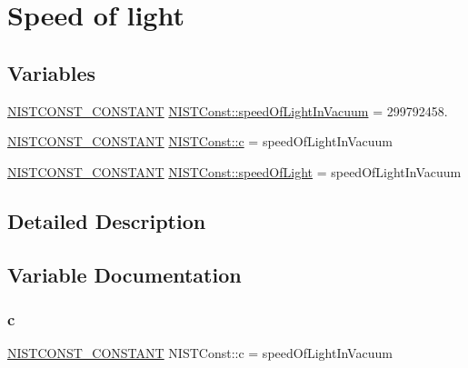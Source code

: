 \hypertarget{group___n_i_s_t_const-_speed_of_light}{}\section{Speed of light}
\label{group___n_i_s_t_const-_speed_of_light}
\subsection*{Variables}
\begin{DoxyCompactItemize}
\item 
\mbox{\hyperlink{group___n_i_s_t_const-_macros_ga2b0fc1d7452373f816175dd86ce26729}{N\+I\+S\+T\+C\+O\+N\+S\+T\+\_\+\+C\+O\+N\+S\+T\+A\+NT}} \mbox{\hyperlink{group___n_i_s_t_const-_speed_of_light_ga5b7c240e787216aab4b730470074888e}{N\+I\+S\+T\+Const\+::speed\+Of\+Light\+In\+Vacuum}} = 299792458.
\item 
\mbox{\hyperlink{group___n_i_s_t_const-_macros_ga2b0fc1d7452373f816175dd86ce26729}{N\+I\+S\+T\+C\+O\+N\+S\+T\+\_\+\+C\+O\+N\+S\+T\+A\+NT}} \mbox{\hyperlink{group___n_i_s_t_const-_speed_of_light_gadcdcae4ce541e73c0a15e25bf7f58fcf}{N\+I\+S\+T\+Const\+::c}} = speed\+Of\+Light\+In\+Vacuum
\item 
\mbox{\hyperlink{group___n_i_s_t_const-_macros_ga2b0fc1d7452373f816175dd86ce26729}{N\+I\+S\+T\+C\+O\+N\+S\+T\+\_\+\+C\+O\+N\+S\+T\+A\+NT}} \mbox{\hyperlink{group___n_i_s_t_const-_speed_of_light_ga44583a4eba890815ba1833de360a2292}{N\+I\+S\+T\+Const\+::speed\+Of\+Light}} = speed\+Of\+Light\+In\+Vacuum
\end{DoxyCompactItemize}


\subsection{Detailed Description}


\subsection{Variable Documentation}
\mbox{\label{group___n_i_s_t_const-_speed_of_light_gadcdcae4ce541e73c0a15e25bf7f58fcf}} 
\subsubsection{\texorpdfstring{c}{c}}
{\footnotesize\ttfamily \mbox{\hyperlink{group___n_i_s_t_const-_macros_ga2b0fc1d7452373f816175dd86ce26729}{N\+I\+S\+T\+C\+O\+N\+S\+T\+\_\+\+C\+O\+N\+S\+T\+A\+NT}} N\+I\+S\+T\+Const\+::c = speed\+Of\+Light\+In\+Vacuum}

